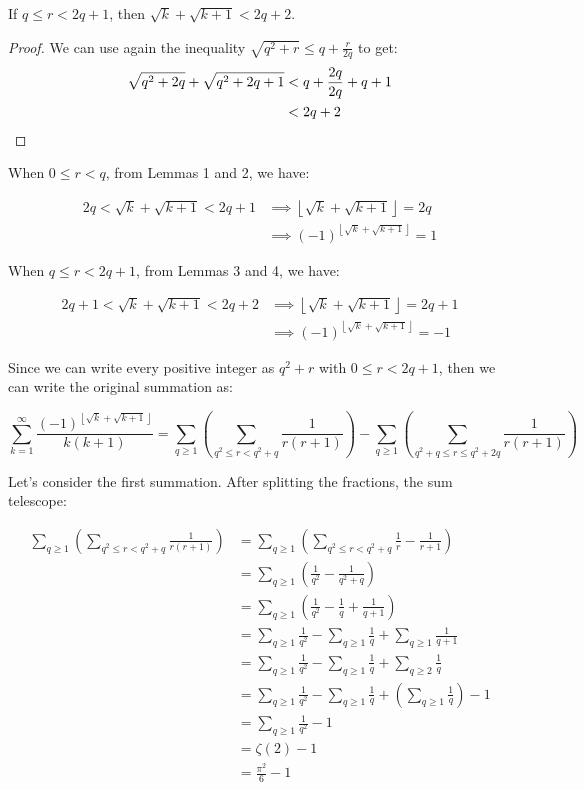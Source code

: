 \documentclass{letter}
\begin{document}
\begin{letter}{}
  \begin{lemma}
    If $q\le r <2q+1$, then $\sqrt{k}+\sqrt{k+1}<2q+2$.
  \end{lemma}
\begin{proof}
  We can use again the inequality $\sqrt{q^2+r}\le q+\frac{r}{2q}$ to get:
  \begin{align*}
    \sqrt{q^2+2q}+\sqrt{q^2+2q+1}
    &< q+\frac{2q}{2q}+q+1 \\
    &< 2q+2 \qedhere
  \end{align*}
\end{proof}

When $0\le r<q$, from Lemmas 1 and 2, we have:

\begin{align*}
  2q < \sqrt{k}+\sqrt{k+1} < 2q+1 &\implies 
\left\lfloor \sqrt{k}+\sqrt{k+1} \right\rfloor = 2q \\
  &\implies (-1)^{
  \left\lfloor \sqrt{k}+\sqrt{k+1} \right\rfloor} =1
\end{align*}

When $q\le r<2q+1$, from Lemmas 3 and 4, we have:

\begin{align*}
  2q+1 < \sqrt{k}+\sqrt{k+1} < 2q+2 &\implies 
\left\lfloor \sqrt{k}+\sqrt{k+1} \right\rfloor = 2q+1\\
  &\implies (-1)^{
  \left\lfloor \sqrt{k}+\sqrt{k+1} \right\rfloor} =-1
\end{align*}

Since we can write every positive integer as $q^2+r$ with $0\le r<2q+1$, then we can write the original summation as:

$$\sum_{k=1}^{\infty}\frac{(-1)^{\left\lfloor\sqrt{k}+\sqrt{k+1}\right\rfloor}}{k(k+1)}
=
\sum_{q\ge 1}\left(\sum_{q^2\le r<q^2+q}\frac{1}{r(r+1)}\right)-
\sum_{q\ge 1}\left(\sum_{q^2+q\le r\le q^2+2q}\frac{1}{r(r+1)}\right)
$$

Let's consider the first summation. After splitting the fractions, the sum telescope:

\begin{align*}
\sum_{q\ge 1}\left(\sum_{q^2\le r<q^2+q}\frac{1}{r(r+1)}\right)
  &= 
  \sum_{q\ge 1}\left(\sum_{q^2\le r<q^2+q}\frac{1}{r}-\frac{1}{r+1}\right) \\
  &=
  \sum_{q\ge 1}\left(\frac{1}{q^2}-\frac{1}{q^2+q}\right) \\
  &=
  \sum_{q\ge 1}\left(\frac{1}{q^2}-\frac{1}{q}+\frac{1}{q+1}\right) \\
  &=
  \sum_{q\ge 1}\frac{1}{q^2}
  -\sum_{q\ge 1}\frac{1}{q}
  +\sum_{q\ge 1}\frac{1}{q+1} \\
  &=
  \sum_{q\ge 1}\frac{1}{q^2}
  -\sum_{q\ge 1}\frac{1}{q}
  +\sum_{q\ge 2}\frac{1}{q} \\
  &=
  \sum_{q\ge 1}\frac{1}{q^2}
  -\sum_{q\ge 1}\frac{1}{q}
  +\left(\sum_{q\ge 1}\frac{1}{q}\right) -1\\
  &=
  \sum_{q\ge 1}\frac{1}{q^2}-1 \\
  &=\zeta(2)-1 \\
  &=\frac{\pi^2}{6}-1
\end{align*}


\end{letter}
\end{document}
